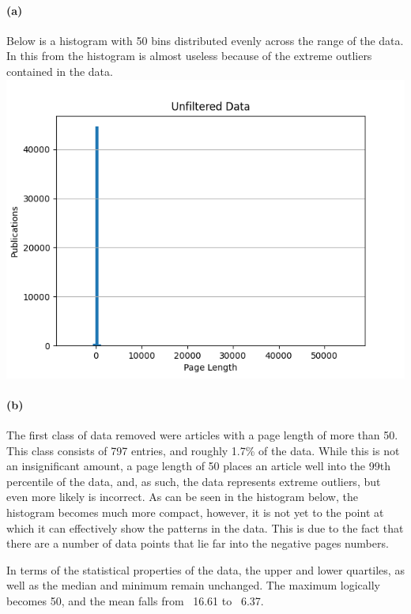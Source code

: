\documentclass[11pt,a4paper,parskip=half ]{scrartcl}
\begin{document}
\paragraph{(a)}Below is a histogram with 50 bins distributed evenly across the range of the data. In this from the histogram is almost useless because of the extreme outliers contained in the data. \\
\includegraphics[width=\textwidth]{task02hist01.png}

\paragraph{(b)} The first class of data removed were articles with a page length of more than 50. This class consists of 797 entries, and roughly 1.7\% of the data. While this is not an insignificant amount, a page length of 50 places an article well into the 99th percentile of the data, and, as such, the data represents extreme outliers, but even more likely is incorrect. As can be seen in the histogram below, the histogram becomes much more compact, however, it is not yet to the point at which it can effectively show the patterns in the data. This is due to the fact that there are a number of data points that lie far into the negative pages numbers.

In terms of the statistical properties of the data, the upper and lower quartiles, as well as the median and minimum remain unchanged. The maximum logically becomes 50, and the mean falls from ~16.61 to ~6.37.
\end{document}

